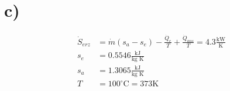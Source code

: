 

\section*{c)}
\begin{align*}
\dot{S}_{erz} &= \dot{m} (s_a - s_e) - \frac{\dot{Q}_e}{T} + \frac{\dot{Q}_{aus}}{T} = 4.3 \frac{\text{kW}}{\text{K}} \\
s_e &= 0.5546 \frac{\text{kJ}}{\text{kg K}} \\
s_a &= 1.3065 \frac{\text{kJ}}{\text{kg K}} \\
T &= 100^\circ \text{C} = 373 \text{K}
\end{align*}